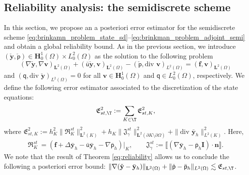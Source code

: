 \documentclass[final]{siamart0216}
\begin{document}
\subsection{Reliability analysis: the semidiscrete scheme} 
In this section, we propose an a posteriori error estimator for the semidiscrete scheme \eqref{eq:brinkamn_problem_state_sd}--\eqref{eq:brinkman_problem_adjoint_semi} and obtain a global reliability bound. 
As in the previous section, we introduce $(\check{\mathbf{y}},\check{\mathsf{p}})\in \mathbf{H}_0^1(\Omega)\times L_0^2(\Omega)$ as the solution to the following problem
\begin{equation}
\label{eq:brinkamn_problem_state_aux_semi}
(\nabla \check{\mathbf{y}},\nabla \mathbf{v})_{\mathbf{L}^2(\Omega)}+(\bar{\mathsf{u}}\check{\mathbf{y}}, \mathbf{v})_{\mathbf{L}^2(\Omega)}-(\check{\mathsf{p}},\text{div }\mathbf{v})_{L^2(\Omega)} = 	(\mathbf{f},\mathbf{v})_{\mathbf{L}^2(\Omega)}
\end{equation}
and $(\mathsf{q},\text{div }\check{\mathbf{y}})_{L^2(\Omega)}  = 0$ for all $\mathbf{v} \in \mathbf{H}_0^1(\Omega)$ and $\mathsf{q} \in L_0^2(\Omega)$, respectively.
We define the following error estimator associated to the discretization of the state equations:
\begin{equation*}\label{eq:estimator_st_semi}
\mathfrak{E}_{st,\T}^2:= \sum_{K\in\T}\mathfrak{E}_{st,K}^2, 
\end{equation*}
where $\mathfrak{E}_{st,K}^2:=h_K^2  \|\mathfrak{R}_{K}^{st}\|_{\mathbf{L}^2(K)}^2 + h_K  \|\mathfrak{J}_{\gamma}^{st}\|_{\mathbf{L}^2(\partial K\setminus\partial \Omega)}^2+\|\text{div }\bar{\mathbf{y}}_{h}\|_{L^2(K)}^2$. Here,
\begin{align*}\label{eq:residual_state_semi}
\mathfrak{R}_{K}^{st}\ = (\mathbf{f}+\Delta \bar{\mathbf{y}}_{h} - \bar{\mathsf{u}}\bar{\mathbf{y}}_{h} - \nabla\bar{\mathsf{p}}_{h})|_K,
\qquad 
\mathfrak{J}_{\gamma}^{st} := \llbracket(\nabla \bar{\mathbf{y}}_{h}-\bar{\mathsf{p}}_{h}\mathbf{I})\cdot \mathbf{n}\rrbracket.
\end{align*}
We note that the result of Theorem \ref{eq:reliability} allows us to conclude the following a posteriori error bound:
$\|\nabla(\check{\mathbf{y}}-\bar{\mathbf{y}}_{h})\|_{\mathbf{L}^2(\Omega)} +\|\check{\mathsf{p}}-\bar{\mathsf{p}}_{h}\|_{L^2(\Omega)} \lesssim \mathfrak{E}_{st,\T}$.
\end{document}
